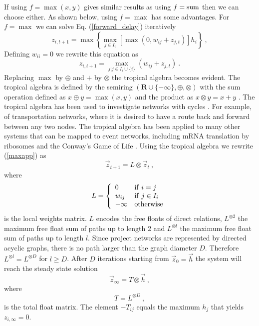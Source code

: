 \documentclass[reprint,aps,prl,amsmath,amssymb,superscriptaddress,showpacs]{revtex4-1}
\begin{document}
If using $f=\max(x,y)$ gives similar results as using $f={\rm sum}$ then we can choose either. As shown below, using  $f=\max$ has some advantages. For $f=\max$ we can solve Eq. (\ref{forward_delay}) iteratively
%
\begin{equation}
z_{i,t+1} = \max\left\{ \max_{j\in I_i}\left[ \max(0,w_{ij}+z_{j,t})\right] h_i\right\}\ ,
\label{forward_delay_iter} 
\end{equation}
%
Defining $w_{ii}=0$ we rewrite this equation as
%
\begin{equation}
z_{i,t+1} = \max_{j|j\in I_i\cup\{i\}} (w_{ij}+z_{j,t})\ .
\label{maxapp}
\end{equation}
%
Replacing $\max$ by $\oplus$ and $+$ by $\otimes$ the tropical algebra becomes evident. The tropical algebra is defined by the semiring $(\mathbf{R}\cup\{-\infty\},\oplus,\otimes)$ with the sum operation defined as
$x\oplus y = \max(x,y)$ and the product as $x\otimes y = x+y$ \cite{butkovic10}. The tropical algebra has been used to investigate networks with cycles \cite{hei14}. For example, of transportation networks, where it is desired to have a route back and forward between any two nodes. The tropical algebra has been applied to many other systems that can be mapped to event networks, including mRNA translation by ribosomes \cite{brackley12} and the  Conway’s Game of Life \cite{sakata20}. Using the tropical algebra we rewrite  (\ref{maxapp}) as
%
\begin{equation}
\vec{z}_{t+1} = L\otimes \vec{z}_t\ ,
\label{maxplus} 
\end{equation}
%
where
%
\begin{equation}
L = \left\{
\begin{array}{ll}
0 & {\rm if}\ i=j\\
w_{ij} & {\rm if}\ j\in I_i\\
-\infty & {\rm otherwise}
\end{array}\right.
\label{L}
\end{equation}
%
is the local weights matrix. $L$ encodes the free floats of direct relations, $L^{\otimes 2}$  the maximum free float sum of  paths up to length 2 and $L^{\otimes l}$  the maximum free float sum of paths up to length $l$. Since
project networks are represented by directed acyclic graphs, there is no path larger than the graph diameter $D$. Therefore $L^{\otimes l}=L^{\otimes D}$ for $l\geq D$. After $D$ iterations starting from $\vec{z}_0=\vec{h}$ the system will reach the steady state solution
%
\begin{equation}
\vec{z}_{\infty} = T\otimes \vec{h}\ ,
\label{maxplus_oo} 
\end{equation}
%
where
%
\begin{equation}
T = L^{\otimes D}\ ,
\label{T}
\end{equation}
%
is the total float matrix. The element $-T_{ij}$ equals the maximum $h_j$ that yields $z_{i,\infty}=0$.
\end{document}
